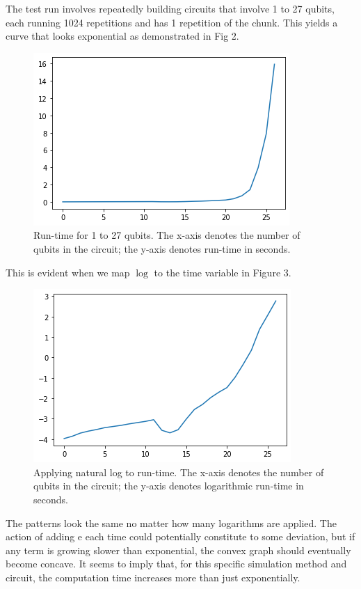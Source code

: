 \documentclass{article}
\begin{document}
The test run involves repeatedly building circuits that involve 1 to 27 qubits, each running 1024 repetitions and has 1 repetition of the chunk. This yields a curve that looks exponential as demonstrated in Fig 2.

\begin{figure}[p]
    \centering
    \includegraphics[width = 0.8\linewidth]{runtime/1-27 1.png}
    \caption{Run-time for 1 to 27 qubits. The x-axis denotes the number of qubits in the circuit; the y-axis denotes run-time in seconds.}
    \label{fig:my_label}
\end{figure}

This is evident when we map $\log$ to the time variable in Figure 3.

\begin{figure}[p]
    \centering
    \includegraphics[width = 0.8\linewidth]{runtime/1-27 1log.png}
    \caption{Applying natural log to run-time.  The x-axis denotes the number of qubits in the circuit; the y-axis denotes logarithmic run-time in seconds.}
    \label{fig:my_label}
\end{figure}

The patterns look the same no matter how many logarithms are applied. The action of adding e each time could potentially constitute to some deviation, but if any term is growing slower than exponential, the convex graph should eventually become concave. It seems to imply that, for this specific simulation method and circuit, the computation time increases more than just exponentially.
\end{document}
